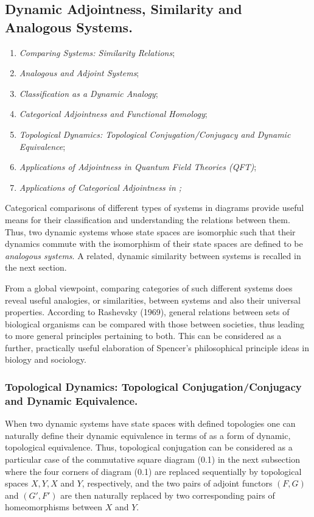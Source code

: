 \documentclass[12pt]{article}
\theoremstyle{plain}
\theoremstyle{definition}
\theoremstyle{plain}
\numberwithin{equation}{section}
\newcommand{\med}{\medbreak}
\begin{document}
\subsection{Dynamic Adjointness, Similarity and Analogous Systems.}
\med
\begin{enumerate}
\item \emph{Comparing Systems: Similarity Relations}; 
\item \emph{Analogous and Adjoint Systems}; 
\item \emph{Classification as a Dynamic Analogy};
\item \emph{Categorical Adjointness and Functional Homology};
\item \emph{Topological Dynamics: Topological Conjugation/Conjugacy and Dynamic Equivalence};
\item \emph{Applications of Adjointness in Quantum Field Theories (QFT)};
\item \emph{Applications of Categorical Adjointness in ;}
\end{enumerate}

 Categorical comparisons of different types of systems in diagrams provide useful means for their classification and understanding the relations between them.  Thus, two dynamic systems whose state spaces are isomorphic such that their dynamics commute with the isomorphism of their state spaces are defined to be \emph{analogous systems}. A related,
dynamic similarity between systems is recalled in the next section. 


From a global viewpoint, comparing categories of such different systems does reveal useful
analogies, or similarities, between systems and also their universal properties. According to Rashevsky (1969), general
relations between sets of biological organisms can be compared with those between societies, thus leading to more general principles pertaining to both. This can be considered as a further, practically useful
elaboration of Spencer's philosophical principle ideas in biology and sociology.


\med


\subsubsection{Topological Dynamics: Topological Conjugation/Conjugacy and Dynamic Equivalence.}

 When two dynamic systems have state spaces with defined topologies one can naturally 
define their dynamic equivalence in terms of  as a form of 
dynamic, topological equivalence. Thus, topological conjugation can be considered as a particular case of the
commutative square diagram (0.1) in the next subsection where the four corners of diagram (0.1) are replaced sequentially by topological spaces $X, Y, X$ and $Y$, respectively, and the two pairs of adjoint functors $(F, G)$ and $(G',F')$ are then naturally replaced by two corresponding pairs of homeomorphisms between $X$ and $Y$.
\end{document}
